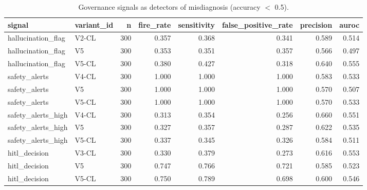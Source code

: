 \begin{table}[t]
\centering
\small
\begin{tabular}{llrrrrrr}
\toprule
signal & variant\_id & n & fire\_rate & sensitivity & false\_positive\_rate & precision & auroc \\
\midrule
hallucination\_flag & V2-CL & 300 & 0.357 & 0.368 & 0.341 & 0.589 & 0.514 \\
hallucination\_flag & V5 & 300 & 0.353 & 0.351 & 0.357 & 0.566 & 0.497 \\
hallucination\_flag & V5-CL & 300 & 0.380 & 0.427 & 0.318 & 0.640 & 0.555 \\
safety\_alerts & V4-CL & 300 & 1.000 & 1.000 & 1.000 & 0.583 & 0.533 \\
safety\_alerts & V5 & 300 & 1.000 & 1.000 & 1.000 & 0.570 & 0.507 \\
safety\_alerts & V5-CL & 300 & 1.000 & 1.000 & 1.000 & 0.570 & 0.533 \\
safety\_alerts\_high & V4-CL & 300 & 0.313 & 0.354 & 0.256 & 0.660 & 0.551 \\
safety\_alerts\_high & V5 & 300 & 0.327 & 0.357 & 0.287 & 0.622 & 0.535 \\
safety\_alerts\_high & V5-CL & 300 & 0.337 & 0.345 & 0.326 & 0.584 & 0.511 \\
hitl\_decision & V3-CL & 300 & 0.330 & 0.379 & 0.273 & 0.616 & 0.553 \\
hitl\_decision & V5 & 300 & 0.747 & 0.766 & 0.721 & 0.585 & 0.523 \\
hitl\_decision & V5-CL & 300 & 0.750 & 0.789 & 0.698 & 0.600 & 0.546 \\
\bottomrule
\end{tabular}
\caption{Governance signals as detectors of misdiagnosis (accuracy $<$ 0.5).}
\label{tab:rigor_alert_discrimination}
\end{table}
